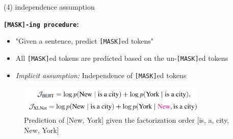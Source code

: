 
\begin{frame}{(4) independence assumption}

\vspace{1.5cm}

\textbf{\texttt{[MASK]-ing procedure}:}

\begin{itemize}
	\item "Given a sentence, predict \texttt{[MASK]}ed tokens"
	\item All \texttt{[MASK]}ed tokens are predicted based on the un-\texttt{[MASK]}ed tokens
	\item \textit{Implicit assumption:} Independence of \texttt{[MASK]}ed tokens
\end{itemize}

	\begin{figure}
		\centering
		\includegraphics[width = 9cm]{figure/xlnet-objective}\\ 
		{\tiny Prediction of [New, York] given the factorization order [is, a, city, New, York]}\\
	\end{figure}
	
\end{frame}


